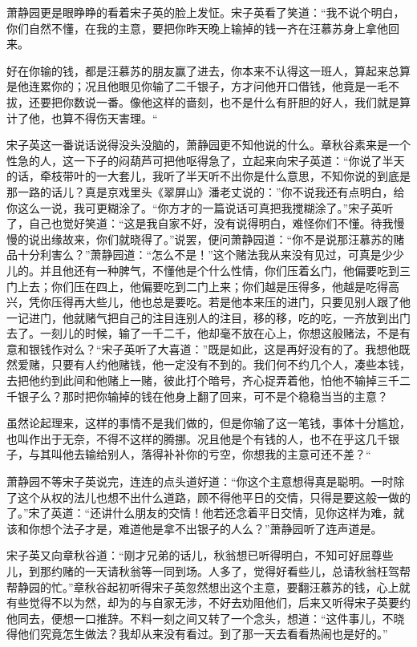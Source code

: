 \documentclass[12pt,UTF8]{ctexbook}
\begin{document}
{{{萧静园更是眼睁睁的看着宋子英的脸上发怔。宋子英看了笑道：“我不说个明白，你们自然不懂，在我的主意，要把你昨天晚上输掉的钱一齐在汪慕苏身上拿他回来。

好在你输的钱，都是汪慕苏的朋友赢了进去，你本来不认得这一班人，算起来总算是他连累你的；况且他眼见你输了二千银子，方才问他开口借钱，他竟是一毛不拔，还要把你数说一番。像他这样的啬刻，也不是什么有肝胆的好人，我们就是算计了他，也算不得伤天害理。“

宋子英这一番说话说得没头没脑的，萧静园更不知他说的什么。章秋谷素来是一个性急的人，这一下子的闷葫芦可把他呕得急了，立起来向宋子英道：“你说了半天的话，牵枝带叶的一大套儿，我听了半天听不出你是什么意思，不知你说的到底是那一路的话儿？真是京戏里头《翠屏山》潘老丈说的：”你不说我还有点明白，给你这么一说，我可更糊涂了。“你方才的一篇说话可真把我搅糊涂了。”宋子英听了，自己也觉好笑道：“这是我自家不好，没有说得明白，难怪你们不懂。待我慢慢的说出缘故来，你们就晓得了。”说罢，便问萧静园道：“你不是说那汪慕苏的赌品十分利害么？”萧静园道：“怎么不是！”这个赌法我从来没有见过，可真是少少儿的。并且他还有一种脾气，不懂他是个什么性情，你们压着幺门，他偏要吃到三门上去；你们压在四上，他偏要吃到二门上来；你们越是压得多，他越是吃得高兴，凭你压得再大些儿，他也总是要吃。若是他本来压的进门，只要见别人跟了他一记进门，他就赌气把自己的注目连别人的注目，移的移，吃的吃，一齐放到出门去了。一刻儿的时候，输了一千二千，他却毫不放在心上，你想这般赌法，不是有意和银钱作对么？“宋子英听了大喜道：”既是如此，这是再好没有的了。我想他既然爱赌，只要有人约他赌钱，他一定没有不到的。我们何不约几个人，凑些本钱，去把他约到此间和他赌上一赌，彼此打个暗号，齐心捉弄着他，怕他不输掉三千二千银子么？那时把你输掉的钱在他身上翻了回来，可不是个稳稳当当的主意？

虽然论起理来，这样的事情不是我们做的，但是你输了这一笔钱，事体十分尴尬，也叫作出于无奈，不得不这样的腾挪。况且他是个有钱的人，也不在乎这几千银子，与其叫他去输给别人，落得补补你的亏空，你想我的主意可还不差？“

萧静园不等宋子英说完，连连的点头道好道：“你这个主意想得真是聪明。一时除了这个从权的法儿也想不出什么道路，顾不得他平日的交情，只得是要这般一做的了。”宋了英道：“还讲什么朋友的交情！他若还念着平日交情，见你这样为难，就该和你想个法子才是，难道他是拿不出银子的人么？”萧静园听了连声道是。

宋子英又向章秋谷道：“刚才兄弟的话儿，秋翁想已听得明白，不知可好屈尊些儿，到那约赌的一天请秋翁等一同到场。人多了，觉得好看些儿，总请秋翁枉驾帮帮静园的忙。”章秋谷起初听得宋子英忽然想出这个主意，要翻汪慕苏的钱，心上就有些觉得不以为然，却为的与自家无涉，不好去劝阻他们，后来又听得宋子英要约他同去，便想一口推辞。不料一刻之间又转了一个念头，想道：“这件事儿，不晓得他们究竟怎生做法？我却从来没有看过。到了那一天去看看热闹也是好的。”

}}}
\end{document}
